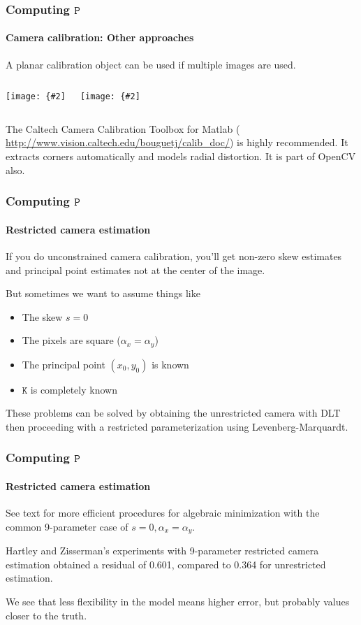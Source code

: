 \documentclass[aspectratio=169]{beamer}
\newcommand{\mat}[1]{\mathtt{#1}}
\newcommand{\myfig}[3]{\centerline{\texttt{[image: \{\#2]}}}
    \centerline{\scriptsize #3}}
\begin{document}
\begin{frame}
\frametitle{Computing $\mat{P}$}
\framesubtitle{Camera calibration: Other approaches}

A \alert{planar} calibration object can be used if \alert{multiple
  images} are used.

\medskip

\begin{columns}
\column{2.5in}
\myfig{2.4in}{calib-image}{}
\column{2in}
\myfig{1.9in}{matlab-toolbox}{(From the Caltech toolbox Web site)}
\end{columns}

The \alert{Caltech Camera Calibration Toolbox for Matlab}
({\scriptsize
  \url{http://www.vision.caltech.edu/bouguetj/calib_doc/}}) is highly
recommended.  It extracts corners automatically and models
radial distortion.  It is part of OpenCV also.

\end{frame}

\begin{frame}
\frametitle{Computing $\mat{P}$}
\framesubtitle{Restricted camera estimation}

If you do \alert{unconstrained} camera calibration, you'll get
non-zero skew estimates and principal point estimates not at the
center of the image.

\medskip

But sometimes we want to assume things like
\begin{itemize}
\item The skew $s=0$
\item The pixels are square ($\alpha_x=\alpha_y$)
\item The principal point $(x_0,y_0)$ is known
\item $\mat{K}$ is completely known
\end{itemize}

\medskip

These problems can be solved by obtaining the unrestricted camera with
DLT then proceeding with a \alert{restricted parameterization} using
Levenberg-Marquardt.

\end{frame}

\begin{frame}
\frametitle{Computing $\mat{P}$}
\framesubtitle{Restricted camera estimation}

See text for more efficient procedures for algebraic minimization with
the common \alert{9-parameter case} of $s=0,\alpha_x=\alpha_y$.

\medskip

Hartley and Zisserman's experiments with 9-parameter restricted camera
estimation obtained a residual of 0.601, compared to 0.364 for
unrestricted estimation.

\medskip

We see that \alert{less flexibility} in the model means \alert{higher
  error}, but probably values \alert{closer to the truth}.

\end{frame}
\end{document}
